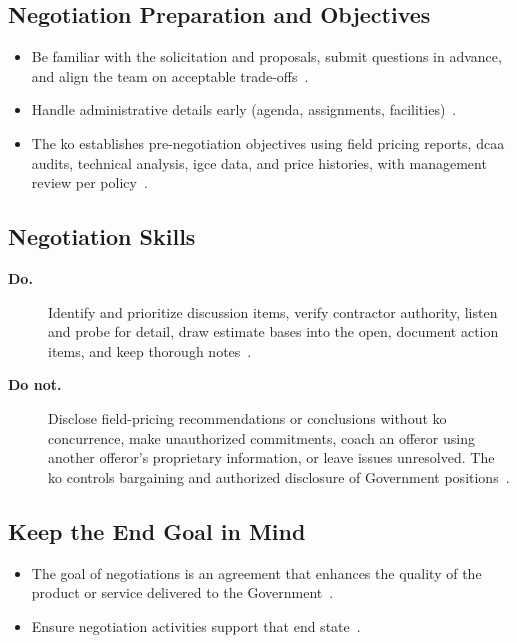 \documentclass[../main.tex]{subfiles}
\begin{document}
\subsection{Negotiation Preparation and Objectives}
\begin{itemize}
  \item Be familiar with the solicitation and proposals, submit questions in advance, and align the team on acceptable trade-offs~\autocite{edo-3-2-3-source-selection-2025}.
  \item Handle administrative details early (agenda, assignments, facilities)~\autocite{edo-3-2-3-source-selection-2025}.
  \item The \ac{ko} establishes pre-negotiation objectives using field pricing reports, \ac{dcaa} audits, technical analysis, \ac{igce} data, and price histories, with management review per policy~\autocite{edo-3-2-3-source-selection-2025}.
\end{itemize}

\subsection{Negotiation Skills}
\begin{description}
  \item[\textbf{Do.}] Identify and prioritize discussion items, verify contractor authority, listen and probe for detail, draw estimate bases into the open, document action items, and keep thorough notes~\autocite{edo-3-2-3-source-selection-2025}.
  \item[\textbf{Do not.}] Disclose field-pricing recommendations or conclusions without \ac{ko} concurrence, make unauthorized commitments, coach an offeror using another offeror's proprietary information, or leave issues unresolved. The \ac{ko} controls bargaining and authorized disclosure of Government positions~\autocite{edo-3-2-3-source-selection-2025,FAR-Overhaul-Part15-2026}.
\end{description}

\subsection{Keep the End Goal in Mind}
\begin{itemize}
  \item The goal of negotiations is an agreement that enhances the quality of the product or service delivered to the Government~\autocite{edo-3-2-3-source-selection-2025}.
  \item Ensure negotiation activities support that end state~\autocite{edo-3-2-3-source-selection-2025}.
\end{itemize}
\end{document}
